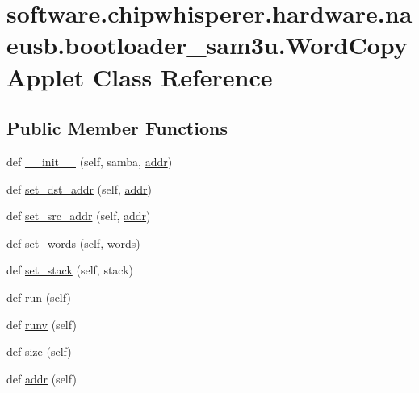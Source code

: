 \hypertarget{classsoftware_1_1chipwhisperer_1_1hardware_1_1naeusb_1_1bootloader__sam3u_1_1WordCopyApplet}{}\section{software.\+chipwhisperer.\+hardware.\+naeusb.\+bootloader\+\_\+sam3u.\+Word\+Copy\+Applet Class Reference}
\label{classsoftware_1_1chipwhisperer_1_1hardware_1_1naeusb_1_1bootloader__sam3u_1_1WordCopyApplet}
\subsection*{Public Member Functions}
\begin{DoxyCompactItemize}
\item 
def \hyperlink{classsoftware_1_1chipwhisperer_1_1hardware_1_1naeusb_1_1bootloader__sam3u_1_1WordCopyApplet_ac3c9eeb84fb5a68918de638eb5eabea5}{\+\_\+\+\_\+init\+\_\+\+\_\+} (self, samba, \hyperlink{classsoftware_1_1chipwhisperer_1_1hardware_1_1naeusb_1_1bootloader__sam3u_1_1WordCopyApplet_a5ee8153119646de2fcd941c5bb32a51a}{addr})
\item 
def \hyperlink{classsoftware_1_1chipwhisperer_1_1hardware_1_1naeusb_1_1bootloader__sam3u_1_1WordCopyApplet_abbf09fa6ed2db33aa7b3a7de3de9626d}{set\+\_\+dst\+\_\+addr} (self, \hyperlink{classsoftware_1_1chipwhisperer_1_1hardware_1_1naeusb_1_1bootloader__sam3u_1_1WordCopyApplet_a5ee8153119646de2fcd941c5bb32a51a}{addr})
\item 
def \hyperlink{classsoftware_1_1chipwhisperer_1_1hardware_1_1naeusb_1_1bootloader__sam3u_1_1WordCopyApplet_a1a1aab97c361af3d202f337052638733}{set\+\_\+src\+\_\+addr} (self, \hyperlink{classsoftware_1_1chipwhisperer_1_1hardware_1_1naeusb_1_1bootloader__sam3u_1_1WordCopyApplet_a5ee8153119646de2fcd941c5bb32a51a}{addr})
\item 
def \hyperlink{classsoftware_1_1chipwhisperer_1_1hardware_1_1naeusb_1_1bootloader__sam3u_1_1WordCopyApplet_a28221c5861db48d7473a23429698252d}{set\+\_\+words} (self, words)
\item 
def \hyperlink{classsoftware_1_1chipwhisperer_1_1hardware_1_1naeusb_1_1bootloader__sam3u_1_1WordCopyApplet_a9827f8f8cb488c3c904387810aeb35eb}{set\+\_\+stack} (self, stack)
\item 
def \hyperlink{classsoftware_1_1chipwhisperer_1_1hardware_1_1naeusb_1_1bootloader__sam3u_1_1WordCopyApplet_a53628edcd6fd16304cc03f97a7408cce}{run} (self)
\item 
def \hyperlink{classsoftware_1_1chipwhisperer_1_1hardware_1_1naeusb_1_1bootloader__sam3u_1_1WordCopyApplet_a80f52804c0dcdd8659e4d9d4c89692c7}{runv} (self)
\item 
def \hyperlink{classsoftware_1_1chipwhisperer_1_1hardware_1_1naeusb_1_1bootloader__sam3u_1_1WordCopyApplet_a30aa56e36d95361125cc109a052e5d2e}{size} (self)
\item 
def \hyperlink{classsoftware_1_1chipwhisperer_1_1hardware_1_1naeusb_1_1bootloader__sam3u_1_1WordCopyApplet_a5ee8153119646de2fcd941c5bb32a51a}{addr} (self)
\end{DoxyCompactItemize}


